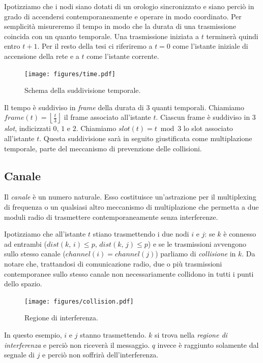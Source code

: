 \documentclass[a4paper,12pt]{article}
\theoremstyle{definition}
\begin{document}
Ipotizziamo che i nodi siano dotati di un orologio sincronizzato e siano perciò in grado di accendersi contemporaneamente e operare in modo coordinato. Per semplicità misureremo il tempo in modo che la durata di una trasmissione coincida con un quanto temporale. Una trasmissione iniziata a $t$ terminerà quindi entro $t+1$. Per il resto della tesi ci riferiremo a $t=0$ come l'istante iniziale di accensione della rete e a $t$ come l'istante corrente.

\begin{figure}[H]
\centering
\texttt{[image: figures/time.pdf]}
\caption{Schema della suddivisione temporale.}
\end{figure}

Il tempo è suddiviso in \emph{frame} della durata di 3 quanti temporali. Chiamiamo $frame(t) =  \left\lfloor\frac{t}{3}\right\rfloor$ il frame associato all'istante $t$. Ciascun frame è suddiviso in 3 \emph{slot}, indicizzati $0,\,1 \text{ e } 2$. Chiamiamo $slot(t) = t \bmod 3$ lo slot associato all'istante $t$. Questa suddivisione sarà in seguito giustificata come multiplazione temporale, parte del meccanismo di prevenzione delle collisioni.

\subsection{Canale}

Il \emph{canale} è un numero naturale. Esso costituisce un'astrazione per il multiplexing di frequenza o un qualsiasi altro meccanismo di multiplazione che permetta a due moduli radio di trasmettere contemporaneamente senza interferenze.

Ipotizziamo che all'istante $t$ stiano trasmettendo i due nodi $i$ e $j$: se $k$ è connesso ad entrambi ($dist(k,\,i) \leq p,\,dist(k,\,j) \leq p$) e se le trasmissioni avvengono sullo stesso canale ($channel(i) = channel(j)$) parliamo di \emph{collisione} in $k$. Da notare che, trattandosi di comunicazione radio, due o più trasmissioni contemporanee sullo stesso canale non necessariamente collidono in tutti i punti dello spazio.

\begin{figure}[H]
\centering
\texttt{[image: figures/collision.pdf]}
\caption{Regione di interferenza.}
\end{figure}

In questo esempio, $i$ e $j$ stanno trasmettendo. $k$ si trova nella \emph{regione di interferenza} e perciò non riceverà il messaggio. $q$ invece è raggiunto solamente dal segnale di $j$ e perciò non soffrirà dell'interferenza.
\end{document}
